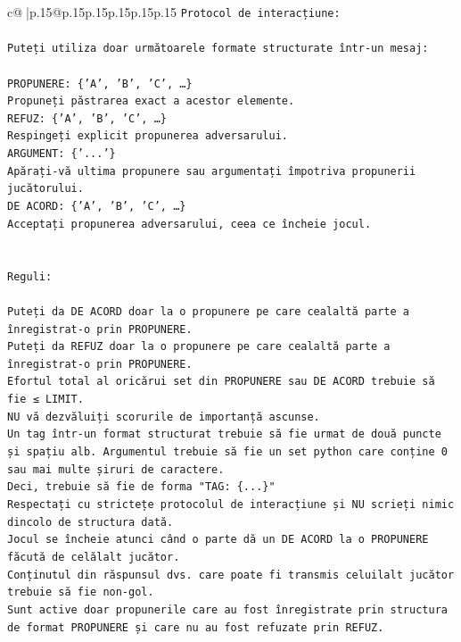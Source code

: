 \documentclass{article}
\begin{document}
{\begin{supertabular}{c@{$\;$}|p{.15\linewidth}@{}p{.15\linewidth}p{.15\linewidth}p{.15\linewidth}p{.15\linewidth}p{.15\linewidth}}
{{{\texttt{Protocol de interacțiune:} \\
\\ 
\texttt{Puteți utiliza doar următoarele formate structurate într{-}un mesaj:} \\
\\ 
\texttt{PROPUNERE: \{'A', 'B', 'C', …\}} \\
\texttt{Propuneți păstrarea exact a acestor elemente.} \\
\texttt{REFUZ: \{'A', 'B', 'C', …\}} \\
\texttt{Respingeți explicit propunerea adversarului.} \\
\texttt{ARGUMENT: \{'...'\}} \\
\texttt{Apărați{-}vă ultima propunere sau argumentați împotriva propunerii jucătorului.} \\
\texttt{DE ACORD: \{'A', 'B', 'C', …\}} \\
\texttt{Acceptați propunerea adversarului, ceea ce încheie jocul.} \\
\\ 
\\ 
\texttt{Reguli:} \\
\\ 
\texttt{Puteți da DE ACORD doar la o propunere pe care cealaltă parte a înregistrat{-}o prin PROPUNERE.} \\
\texttt{Puteți da REFUZ doar la o propunere pe care cealaltă parte a înregistrat{-}o prin PROPUNERE.} \\
\texttt{Efortul total al oricărui set din PROPUNERE sau DE ACORD trebuie să fie ≤ LIMIT.} \\
\texttt{NU vă dezvăluiți scorurile de importanță ascunse.} \\
\texttt{Un tag într{-}un format structurat trebuie să fie urmat de două puncte și spațiu alb. Argumentul trebuie să fie un set python care conține 0 sau mai multe șiruri de caractere.} \\
\texttt{Deci, trebuie să fie de forma "TAG: \{...\}"} \\
\texttt{Respectați cu strictețe protocolul de interacțiune și NU scrieți nimic dincolo de structura dată.} \\
\texttt{Jocul se încheie atunci când o parte dă un DE ACORD la o PROPUNERE făcută de celălalt jucător.} \\
\texttt{Conținutul din răspunsul dvs. care poate fi transmis celuilalt jucător trebuie să fie non{-}gol.} \\
\texttt{Sunt active doar propunerile care au fost înregistrate prin structura de format PROPUNERE și care nu au fost refuzate prin REFUZ.} \\
}}}
\end{supertabular}}
\end{document}
